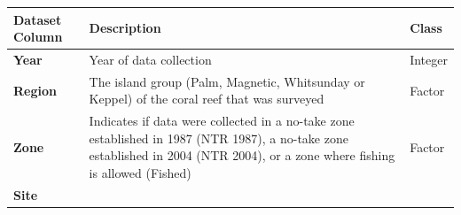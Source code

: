 \documentclass[12pt,]{article}
\begin{document}
\begin{longtable}[]{@{}lll@{}}
\toprule
\begin{minipage}[b]{0.44\columnwidth}\raggedright
Dataset Column\strut
\end{minipage} & \begin{minipage}[b]{0.32\columnwidth}\raggedright
Description\strut
\end{minipage} & \begin{minipage}[b]{0.15\columnwidth}\raggedright
Class\strut
\end{minipage}\tabularnewline
\midrule
\endhead
\begin{minipage}[t]{0.44\columnwidth}\raggedright
\textbf{Year}\strut
\end{minipage} & \begin{minipage}[t]{0.32\columnwidth}\raggedright
Year of data collection\strut
\end{minipage} & \begin{minipage}[t]{0.15\columnwidth}\raggedright
Integer\strut
\end{minipage}\tabularnewline
\begin{minipage}[t]{0.44\columnwidth}\raggedright
\textbf{Region}\strut
\end{minipage} & \begin{minipage}[t]{0.32\columnwidth}\raggedright
The island group (Palm, Magnetic, Whitsunday or Keppel) of the coral
reef that was surveyed\strut
\end{minipage} & \begin{minipage}[t]{0.15\columnwidth}\raggedright
Factor\strut
\end{minipage}\tabularnewline
\begin{minipage}[t]{0.44\columnwidth}\raggedright
\textbf{Zone}\strut
\end{minipage} & \begin{minipage}[t]{0.32\columnwidth}\raggedright
Indicates if data were collected in a no-take zone established in 1987
(NTR 1987), a no-take zone established in 2004 (NTR 2004), or a zone
where fishing is allowed (Fished)\strut
\end{minipage} & \begin{minipage}[t]{0.15\columnwidth}\raggedright
Factor\strut
\end{minipage}\tabularnewline
\begin{minipage}[t]{0.44\columnwidth}\raggedright
\textbf{Site}\strut
\end{minipage} & \begin{minipage}[t]{0.32\columnwidth}\raggedright

\end{minipage}
\end{longtable}
\end{document}
